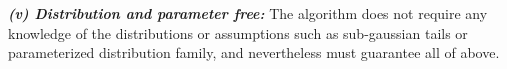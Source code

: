        \emph{\textbf{(v) Distribution and parameter free:}} The algorithm does not require any knowledge of the distributions or assumptions such as sub-gaussian tails or parameterized distribution family, and nevertheless must guarantee all of above.







